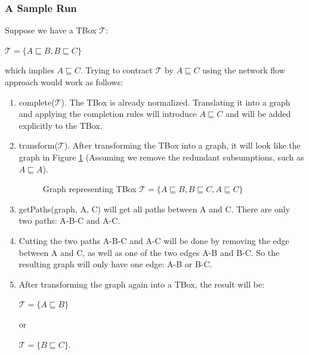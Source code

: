 \subsubsection{A Sample Run}
Suppose we have a TBox $\mathcal{T}$:
\begin{center}
$\mathcal{T} = \lbrace A \sqsubseteq B, B \sqsubseteq C \rbrace$
\end{center}
which implies $A \sqsubseteq C$. Trying to contract $\mathcal{T}$ by $A \sqsubseteq C$ using the network flow approach would work as follows:
\begin{enumerate}
\item complete($\mathcal{T}$). 
The TBox is already normalized. Translating it into a graph and applying the completion rules will introduce $A \sqsubseteq C$ and will be added explicitly to the TBox.
\item transform($\mathcal{T}$).
After transforming the TBox into a graph, it will look like the graph in Figure \ref{fig:abc-kb} (Assuming we remove the redundant subsumptions, such as $A \sqsubseteq A$).

\begin{figure}
\centering
{}
\caption{Graph representing TBox $\mathcal{T} = \lbrace A \sqsubseteq B, B \sqsubseteq C, A \sqsubseteq C \rbrace $}
\label{fig:abc-kb}
\end{figure}

\item getPaths(graph, A, C) will get all paths between A and C. There are only two paths: A-B-C and A-C. 

\item Cutting the two paths A-B-C and A-C will be done by removing the edge between A and C, as well as one of the two edges A-B and B-C. So the resulting graph will only have one edge: A-B or B-C.

\item After transforming the graph again into a TBox, the result will be:
\begin{center}
$\mathcal{T} = \lbrace A \sqsubseteq B \rbrace$
\end{center}
or 
\begin{center}
$\mathcal{T} = \lbrace B \sqsubseteq C \rbrace$.
\end{center}

\end{enumerate}


